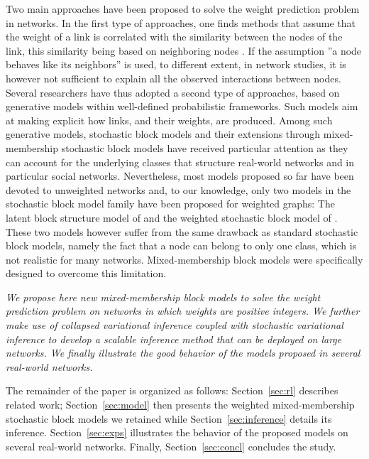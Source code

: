 Two main approaches have been proposed to solve the weight prediction problem in networks. In the first type of approaches, one finds methods that assume that the weight of a link is correlated with the similarity between the nodes of the link, this similarity being based on neighboring nodes \cite{Zhao2015,Zhu2016}. If the assumption ''a node behaves like its neighbors'' is used, to different extent, in network studies, it is however not sufficient to explain all the observed interactions between nodes. Several researchers have thus adopted a second type of approaches, based on generative models within well-defined probabilistic frameworks. Such models aim at making explicit how links, and their weights, are produced. Among such generative models, stochastic block models and their extensions through mixed-membership stochastic block models have received particular attention \cite{ Karrer2011,airoldi2009mixed,iMMSB,fan2015dynamic} as they can account for the underlying classes that structure real-world networks and in particular social networks. Nevertheless, most models proposed so far have been devoted to unweighted networks and, to our knowledge, only two models in the stochastic block model family have been proposed for weighted graphs: The latent block structure model of \cite{aicher2014learning} and the weighted stochastic block model of \cite{peixoto2018nonparametric}. These two models however suffer from the same drawback as standard stochastic block models, namely the fact that a node can belong to only one class, which is not realistic for many networks. Mixed-membership block models were specifically designed to overcome this limitation.

\textit{We propose here new mixed-membership block models to solve the weight prediction problem on networks in which weights are positive integers. We further make use of collapsed variational inference coupled with stochastic variational inference to develop a scalable inference method that can be deployed on large networks. We finally illustrate the good behavior of the models proposed in several real-world networks.}

The remainder of the paper is organized as follows: Section~\ref{sec:rl} describes related work; Section~\ref{sec:model} then presents the weighted mixed-membership stochastic block models we retained while Section~\ref{sec:inference} details its inference. Section~\ref{sec:exps} illustrates the behavior of the proposed models on several real-world networks. Finally, Section~\ref{sec:concl} concludes the study.


